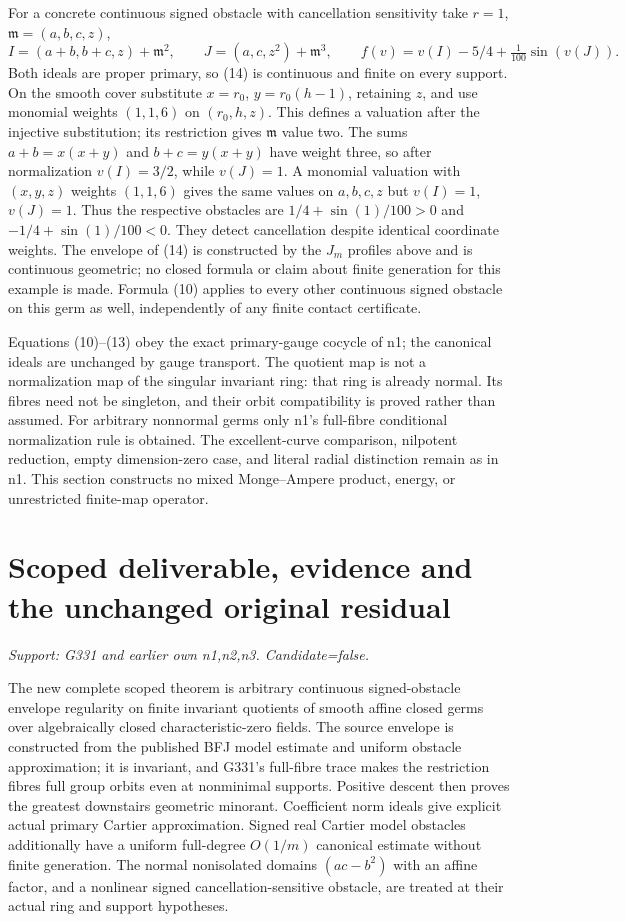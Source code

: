 \documentclass[11pt]{article}
\begin{document}
For a concrete continuous signed obstacle with cancellation sensitivity take $r=1$, $\mathfrak m=(a,b,c,z)$,
\[
 I=(a+b,b+c,z)+\mathfrak m^2,\qquad
 J=(a,c,z^2)+\mathfrak m^3,\qquad
 f(v)=v(I)-5/4+\tfrac1{100}\sin(v(J)). \tag{14}
\]
Both ideals are proper primary, so (14) is continuous and finite on every support. On the smooth cover substitute $x=r_0$, $y=r_0(h-1)$, retaining $z$, and use monomial weights $(1,1,6)$ on $(r_0,h,z)$. This defines a valuation after the injective substitution; its restriction gives $\mathfrak m$ value two. The sums $a+b=x(x+y)$ and $b+c=y(x+y)$ have weight three, so after normalization $v(I)=3/2$, while $v(J)=1$. A monomial valuation with $(x,y,z)$ weights $(1,1,6)$ gives the same values on $a,b,c,z$ but $v(I)=1$, $v(J)=1$. Thus the respective obstacles are $1/4+\sin(1)/100>0$ and $-1/4+\sin(1)/100<0$. They detect cancellation despite identical coordinate weights. The envelope of (14) is constructed by the $J_m$ profiles above and is continuous geometric; no closed formula or claim about finite generation for this example is made. Formula (10) applies to every other continuous signed obstacle on this germ as well, independently of any finite contact certificate.

Equations (10)--(13) obey the exact primary-gauge cocycle of n1; the canonical ideals are unchanged by gauge transport. The quotient map is not a normalization map of the singular invariant ring: that ring is already normal. Its fibres need not be singleton, and their orbit compatibility is proved rather than assumed. For arbitrary nonnormal germs only n1's full-fibre conditional normalization rule is obtained. The excellent-curve comparison, nilpotent reduction, empty dimension-zero case, and literal radial distinction remain as in n1. This section constructs no mixed Monge--Ampere product, energy, or unrestricted finite-map operator.


\section{Scoped deliverable, evidence and the unchanged original residual}
\textit{Support: G331 and earlier own n1,n2,n3. Candidate=false.}

The new complete scoped theorem is arbitrary continuous signed-obstacle envelope regularity on finite invariant quotients of smooth affine closed germs over algebraically closed characteristic-zero fields. The source envelope is constructed from the published BFJ model estimate and uniform obstacle approximation; it is invariant, and G331's full-fibre trace makes the restriction fibres full group orbits even at nonminimal supports. Positive descent then proves the greatest downstairs geometric minorant. Coefficient norm ideals give explicit actual primary Cartier approximation. Signed real Cartier model obstacles additionally have a uniform full-degree $O(1/m)$ canonical estimate without finite generation. The normal nonisolated domains $(ac-b^2)$ with an affine factor, and a nonlinear signed cancellation-sensitive obstacle, are treated at their actual ring and support hypotheses.
\end{document}
